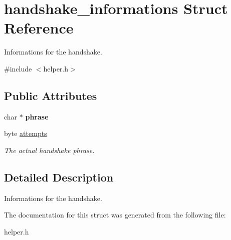 \hypertarget{structhandshake__informations}{\section{handshake\+\_\+informations Struct Reference}
\label{structhandshake__informations}
}


Informations for the handshake.  




{\ttfamily \#include $<$helper.\+h$>$}

\subsection*{Public Attributes}
\begin{DoxyCompactItemize}
\item 
\hypertarget{structhandshake__informations_ad4f282832c3a4e2f59269a68c66ffd1b}{char $\ast$ {\bfseries phrase}}\label{structhandshake__informations_ad4f282832c3a4e2f59269a68c66ffd1b}

\item 
\hypertarget{structhandshake__informations_a728e648cbfb9fb7a1cf1bc97493a976c}{byte \hyperlink{structhandshake__informations_a728e648cbfb9fb7a1cf1bc97493a976c}{attempts}}\label{structhandshake__informations_a728e648cbfb9fb7a1cf1bc97493a976c}

\begin{DoxyCompactList}\small\item\em The actual handshake phrase. \end{DoxyCompactList}\end{DoxyCompactItemize}


\subsection{Detailed Description}
Informations for the handshake. 

The documentation for this struct was generated from the following file\+:\begin{DoxyCompactItemize}
\item 
helper.\+h\end{DoxyCompactItemize}
